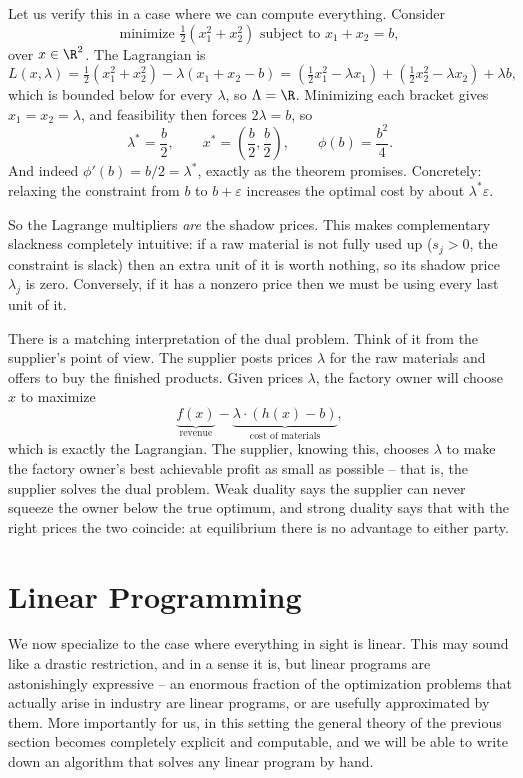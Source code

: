 \begin{example}
    Let us verify this in a case where we can compute everything. Consider
    $$
    \text{minimize } \tfrac12(x_1^2 + x_2^2) \text{ subject to } x_1 + x_2 = b,
    $$
    over $x \in \R^2$. The Lagrangian is
    $$
    L(x,\lambda) = \tfrac12(x_1^2 + x_2^2) - \lambda(x_1 + x_2 - b) = \left(\tfrac12x_1^2 - \lambda x_1\right) + \left(\tfrac12 x_2^2 - \lambda x_2\right) + \lambda b,
    $$
    which is bounded below for every $\lambda$, so $\Lambda = \R$. Minimizing each bracket gives $x_1 = x_2 = \lambda$, and feasibility then forces $2\lambda = b$, so
    $$
    \lambda^* = \frac b2, \qquad x^* = \left(\frac b2, \frac b2\right), \qquad \phi(b) = \frac{b^2}{4}.
    $$
    And indeed $\phi'(b) = b/2 = \lambda^*$, exactly as the theorem promises. Concretely: relaxing the constraint from $b$ to $b + \varepsilon$ increases the optimal cost by about $\lambda^*\varepsilon$.
\end{example}

So the Lagrange multipliers \emph{are} the shadow prices. This makes complementary slackness completely intuitive: if a raw material is not fully used up ($s_j > 0$, the constraint is slack) then an extra unit of it is worth nothing, so its shadow price $\lambda_j$ is zero. Conversely, if it has a nonzero price then we must be using every last unit of it.

There is a matching interpretation of the dual problem. Think of it from the supplier's point of view. The supplier posts prices $\lambda$ for the raw materials and offers to buy the finished products. Given prices $\lambda$, the factory owner will choose $x$ to maximize
$$
\underbrace{f(x)}_{\text{revenue}} - \underbrace{\lambda\cdot(h(x) - b)}_{\text{cost of materials}},
$$
which is exactly the Lagrangian. The supplier, knowing this, chooses $\lambda$ to make the factory owner's best achievable profit as small as possible -- that is, the supplier solves the dual problem. Weak duality says the supplier can never squeeze the owner below the true optimum, and strong duality says that with the right prices the two coincide: at equilibrium there is no advantage to either party.

\section{Linear Programming}

We now specialize to the case where everything in sight is linear. This may sound like a drastic restriction, and in a sense it is, but linear programs are astonishingly expressive -- an enormous fraction of the optimization problems that actually arise in industry are linear programs, or are usefully approximated by them. More importantly for us, in this setting the general theory of the previous section becomes completely explicit and computable, and we will be able to write down an algorithm that solves any linear program by hand.

